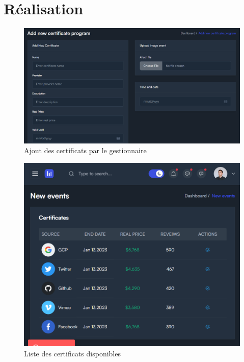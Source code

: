 \documentclass[a4paper, 11pt, openany]{report}
\begin{document}
\section{Réalisation}
\begin{figure}
\centering
\includegraphics[width=\textwidth]{admin-add-certif.png} 
\caption{Ajout des certificats par le gestionnaire}
\label{fig:Ajout_des_certificats}
\end{figure}


\begin{figure}
\centering
\includegraphics[width=\textwidth]{certifs-list.png} 
\caption{Liste des certificats disponibles}
\label{fig:certificates}
\end{figure}
\end{document}
